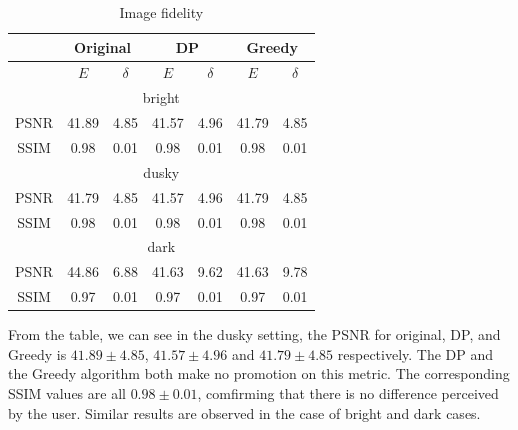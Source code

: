 \begin{table}[h]
  \small
  \centering
  \caption{Image fidelity}
  
  \begin{tabular}{|c|c|c|c|c|c|c|}
    \hline
    & \multicolumn{2}{|c|}{Original} & \multicolumn{2}{|c|}{DP} & \multicolumn{2}{|c|}{Greedy} \\ \hline
    & $E$ & $\delta$ & $E$ & $\delta$ & $E$ & $\delta$ \\ \hline
    \multicolumn{7}{|c|}{bright} \\ \hline
    PSNR & 41.89 & 4.85 & 41.57 & 4.96 & 41.79 & 4.85 \\ \hline
    SSIM & 0.98 & 0.01 & 0.98 & 0.01 & 0.98 & 0.01 \\ \hline
    \multicolumn{7}{|c|}{dusky} \\ \hline
    PSNR & 41.79 & 4.85 & 41.57 & 4.96 & 41.79 & 4.85 \\ \hline
    SSIM & 0.98 & 0.01 & 0.98 & 0.01 & 0.98 & 0.01 \\ \hline
    \multicolumn{7}{|c|}{dark} \\ \hline
    PSNR & 44.86 & 6.88 & 41.63 & 9.62 & 41.63 & 9.78 \\ \hline
    SSIM & 0.97 & 0.01 & 0.97 & 0.01 & 0.97 & 0.01 \\ \hline
  \end{tabular}
  \label{tab:distortion}
\end{table}


From the table, we can see in the dusky setting, the PSNR for
original, DP, and Greedy is $41.89\pm4.85$, $41.57\pm4.96$ and
$41.79\pm4.85$ respectively. The DP and the Greedy algorithm both make
no promotion on this metric. The corresponding SSIM values are all
$0.98\pm0.01$, comfirming that there is no difference perceived by the
user. Similar results are observed in the case of bright and dark
cases.


